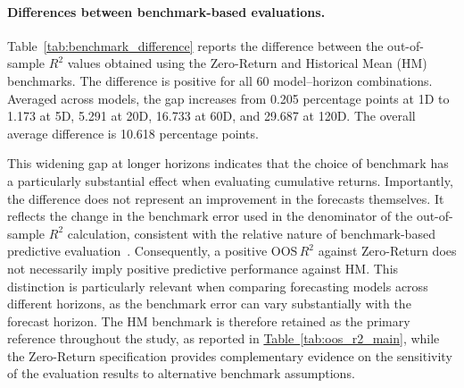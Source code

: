 \documentclass[runningheads,orivec]{llncs}
\begin{document}
\paragraph{Differences between benchmark-based evaluations.} Table~\ref{tab:benchmark_difference} reports the difference between the out-of-sample \(R^2\) values obtained using the Zero-Return and Historical Mean (HM) benchmarks. The difference is positive for all 60 model--horizon combinations. Averaged across models, the gap increases from 0.205 percentage points at 1D to 1.173 at 5D, 5.291 at 20D, 16.733 at 60D, and 29.687 at 120D. The overall average difference is 10.618 percentage points.

This widening gap at longer horizons indicates that the choice of benchmark has a particularly substantial effect when evaluating cumulative returns. Importantly, the difference does not represent an improvement in the forecasts themselves. It reflects the change in the benchmark error used in the denominator of the out-of-sample $R^2$ calculation, consistent with the relative nature of benchmark-based predictive evaluation~\cite{campbell2008,welch2008}. Consequently, a positive $\mathrm{OOS}\,R^2$ against Zero-Return does not necessarily imply positive predictive performance against HM. This distinction is particularly relevant when comparing forecasting models across different horizons, as the benchmark error can vary substantially with the forecast horizon. The HM benchmark is therefore retained as the primary reference throughout the study, as reported in \hyperref[tab:oos_r2_main]{Table~\ref*{tab:oos_r2_main}}, while the Zero-Return specification provides complementary evidence on the sensitivity of the evaluation results to alternative benchmark assumptions.
\end{document}
